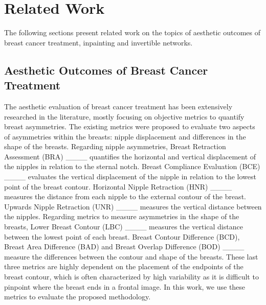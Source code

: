 \section{Related Work}
The following sections present related work on the topics of aesthetic outcomes of breast cancer treatment, inpainting and invertible networks.

\subsection{Aesthetic Outcomes of Breast Cancer Treatment} \label{sec:related-work}

The aesthetic evaluation of breast cancer treatment has been extensively researched in the literature, mostly focusing on objective metrics to quantify breast asymmetries. The existing metrics were proposed to evaluate two aspects of asymmetries within the breasts: nipple displacement and differences in the shape of the breasts. Regarding nipple asymmetries, Breast Retraction Assessment (BRA) ____ quantifies the horizontal and vertical displacement of the nipples in relation to the sternal notch. Breast Compliance Evaluation (BCE) ____ evaluates the vertical displacement of the nipple in relation to the lowest point of the breast contour. Horizontal Nipple Retraction (HNR) ____ measures the distance from each nipple to the external contour of the breast. Upwards Nipple Retraction (UNR) ____ measures the vertical distance between the nipples. Regarding metrics to measure asymmetries in the shape of the breasts, Lower Breast Contour (LBC) ____  measures the vertical distance between the lowest point of each breast. Breast Contour Difference (BCD), Breast Area Difference (BAD) and Breast Overlap Difference (BOD) ____ measure the differences between the contour and shape of the breasts. These last three metrics are highly dependent on the placement of the endpoints of the breast contour, which is often characterized by high variability as it is difficult to pinpoint where the breast ends in a frontal image. In this work, we use these metrics to evaluate the proposed methodology. 

